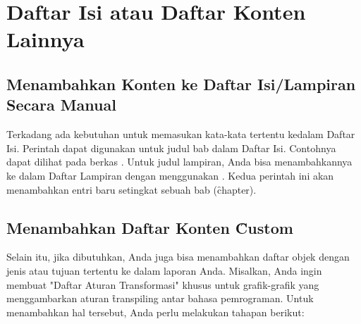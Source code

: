\section{Daftar Isi atau Daftar Konten Lainnya}
\label{sec:tableOfContent}

\subsection{Menambahkan Konten ke Daftar Isi/Lampiran Secara Manual}
\label{sec:addTocEntry}
Terkadang ada kebutuhan untuk memasukan kata-kata tertentu kedalam Daftar Isi.
Perintah  dapat digunakan untuk judul bab dalam Daftar Isi.
Contohnya dapat dilihat pada berkas .
Untuk judul lampiran, Anda bisa menambahkannya ke dalam Daftar Lampiran dengan menggunakan .
Kedua perintah ini akan menambahkan entri baru setingkat sebuah bab (\f{chapter}).

\subsection{Menambahkan Daftar Konten \f{Custom}}
\label{sec:addCustomContentList}
Selain itu, jika dibutuhkan, Anda juga bisa menambahkan daftar objek dengan jenis atau tujuan tertentu ke dalam laporan Anda.
Misalkan, Anda ingin membuat "Daftar Aturan Transformasi" khusus untuk grafik-grafik yang menggambarkan aturan \f{transpiling} antar bahasa pemrograman.
Untuk menambahkan hal tersebut, Anda perlu melakukan tahapan berikut:

